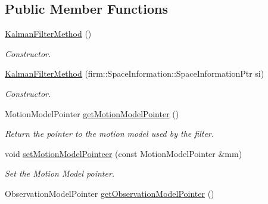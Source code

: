 \subsection*{\-Public \-Member \-Functions}
\begin{DoxyCompactItemize}
\item 
\hypertarget{class_kalman_filter_method_a1a3da9af1c9f982195c064c042feab8e}{\hyperlink{class_kalman_filter_method_a1a3da9af1c9f982195c064c042feab8e}{\-Kalman\-Filter\-Method} ()}\label{class_kalman_filter_method_a1a3da9af1c9f982195c064c042feab8e}

\begin{DoxyCompactList}\small\item\em \-Constructor. \end{DoxyCompactList}\item 
\hypertarget{class_kalman_filter_method_afbea7fdb6e6faffd74de8ee647b97a02}{\hyperlink{class_kalman_filter_method_afbea7fdb6e6faffd74de8ee647b97a02}{\-Kalman\-Filter\-Method} (firm\-::\-Space\-Information\-::\-Space\-Information\-Ptr si)}\label{class_kalman_filter_method_afbea7fdb6e6faffd74de8ee647b97a02}

\begin{DoxyCompactList}\small\item\em \-Constructor. \end{DoxyCompactList}\item 
\hypertarget{class_kalman_filter_method_aed467f00719c58d7be5458f8f99511d9}{\-Motion\-Model\-Pointer \hyperlink{class_kalman_filter_method_aed467f00719c58d7be5458f8f99511d9}{get\-Motion\-Model\-Pointer} ()}\label{class_kalman_filter_method_aed467f00719c58d7be5458f8f99511d9}

\begin{DoxyCompactList}\small\item\em \-Return the pointer to the motion model used by the filter. \end{DoxyCompactList}\item 
\hypertarget{class_kalman_filter_method_a7f2542d72d92f1e44cf4d0cdcaec02b8}{void \hyperlink{class_kalman_filter_method_a7f2542d72d92f1e44cf4d0cdcaec02b8}{set\-Motion\-Model\-Pointeer} (const \-Motion\-Model\-Pointer \&mm)}\label{class_kalman_filter_method_a7f2542d72d92f1e44cf4d0cdcaec02b8}

\begin{DoxyCompactList}\small\item\em \-Set the \-Motion \-Model pointer. \end{DoxyCompactList}\item 
\hypertarget{class_kalman_filter_method_aa93f7e7e297eb337cc1fda8ae46763cc}{\-Observation\-Model\-Pointer \hyperlink{class_kalman_filter_method_aa93f7e7e297eb337cc1fda8ae46763cc}{get\-Observation\-Model\-Pointer} ()}\label{class_kalman_filter_method_aa93f7e7e297eb337cc1fda8ae46763cc}


\end{DoxyCompactItemize}
